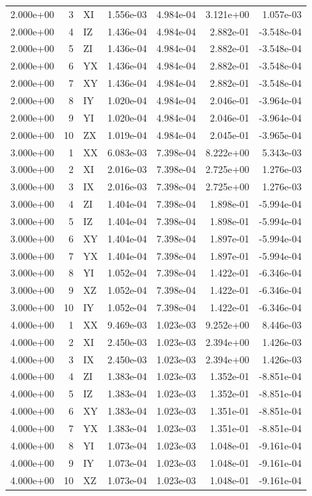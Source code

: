 \begin{tabular}{rrlrrrr}
2.000e+00 & 3 & XI & 1.556e-03 & 4.984e-04 & 3.121e+00 & 1.057e-03 \\
2.000e+00 & 4 & IZ & 1.436e-04 & 4.984e-04 & 2.882e-01 & -3.548e-04 \\
2.000e+00 & 5 & ZI & 1.436e-04 & 4.984e-04 & 2.882e-01 & -3.548e-04 \\
2.000e+00 & 6 & YX & 1.436e-04 & 4.984e-04 & 2.882e-01 & -3.548e-04 \\
2.000e+00 & 7 & XY & 1.436e-04 & 4.984e-04 & 2.882e-01 & -3.548e-04 \\
2.000e+00 & 8 & IY & 1.020e-04 & 4.984e-04 & 2.046e-01 & -3.964e-04 \\
2.000e+00 & 9 & YI & 1.020e-04 & 4.984e-04 & 2.046e-01 & -3.964e-04 \\
2.000e+00 & 10 & ZX & 1.019e-04 & 4.984e-04 & 2.045e-01 & -3.965e-04 \\
3.000e+00 & 1 & XX & 6.083e-03 & 7.398e-04 & 8.222e+00 & 5.343e-03 \\
3.000e+00 & 2 & XI & 2.016e-03 & 7.398e-04 & 2.725e+00 & 1.276e-03 \\
3.000e+00 & 3 & IX & 2.016e-03 & 7.398e-04 & 2.725e+00 & 1.276e-03 \\
3.000e+00 & 4 & ZI & 1.404e-04 & 7.398e-04 & 1.898e-01 & -5.994e-04 \\
3.000e+00 & 5 & IZ & 1.404e-04 & 7.398e-04 & 1.898e-01 & -5.994e-04 \\
3.000e+00 & 6 & XY & 1.404e-04 & 7.398e-04 & 1.897e-01 & -5.994e-04 \\
3.000e+00 & 7 & YX & 1.404e-04 & 7.398e-04 & 1.897e-01 & -5.994e-04 \\
3.000e+00 & 8 & YI & 1.052e-04 & 7.398e-04 & 1.422e-01 & -6.346e-04 \\
3.000e+00 & 9 & XZ & 1.052e-04 & 7.398e-04 & 1.422e-01 & -6.346e-04 \\
3.000e+00 & 10 & IY & 1.052e-04 & 7.398e-04 & 1.422e-01 & -6.346e-04 \\
4.000e+00 & 1 & XX & 9.469e-03 & 1.023e-03 & 9.252e+00 & 8.446e-03 \\
4.000e+00 & 2 & XI & 2.450e-03 & 1.023e-03 & 2.394e+00 & 1.426e-03 \\
4.000e+00 & 3 & IX & 2.450e-03 & 1.023e-03 & 2.394e+00 & 1.426e-03 \\
4.000e+00 & 4 & ZI & 1.383e-04 & 1.023e-03 & 1.352e-01 & -8.851e-04 \\
4.000e+00 & 5 & IZ & 1.383e-04 & 1.023e-03 & 1.352e-01 & -8.851e-04 \\
4.000e+00 & 6 & XY & 1.383e-04 & 1.023e-03 & 1.351e-01 & -8.851e-04 \\
4.000e+00 & 7 & YX & 1.383e-04 & 1.023e-03 & 1.351e-01 & -8.851e-04 \\
4.000e+00 & 8 & YI & 1.073e-04 & 1.023e-03 & 1.048e-01 & -9.161e-04 \\
4.000e+00 & 9 & IY & 1.073e-04 & 1.023e-03 & 1.048e-01 & -9.161e-04 \\
4.000e+00 & 10 & XZ & 1.073e-04 & 1.023e-03 & 1.048e-01 & -9.161e-04 \\
\bottomrule
\end{tabular}
